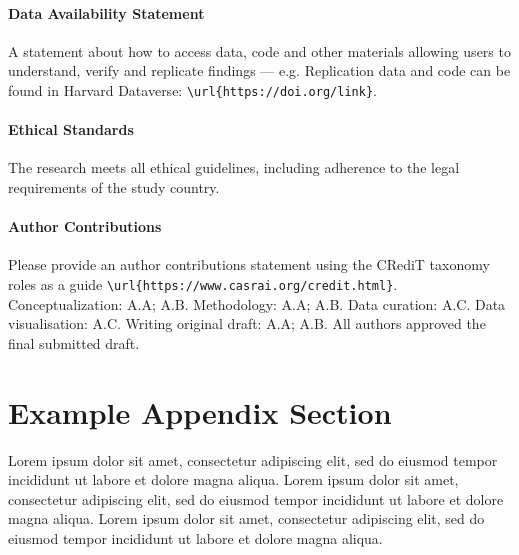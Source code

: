 \documentclass[
  journal=small,
  manuscript=article-type,  %
  year=2020,
  volume=37,
]{cup-journal}
\begin{document}
\paragraph{Data Availability Statement}
A statement about how to access data, code and other materials allowing users to understand, verify and replicate findings --- e.g. Replication data and code can be found in Harvard Dataverse: \verb+\url{https://doi.org/link}+.

\paragraph{Ethical Standards}
The research meets all ethical guidelines, including adherence to the legal requirements of the study country.

\paragraph{Author Contributions}
Please provide an author contributions statement using the CRediT taxonomy roles as a guide {\verb+\url{https://www.casrai.org/credit.html}+}. Conceptualization: A.A; A.B. Methodology: A.A; A.B. Data curation: A.C. Data visualisation: A.C. Writing original draft: A.A; A.B. All authors approved the final submitted draft.



\printendnotes


\printbibliography[prenote={preamble}]

\appendix

\section{Example Appendix Section}

Lorem ipsum dolor sit amet, consectetur adipiscing elit, sed do eiusmod tempor incididunt ut labore et dolore magna aliqua. Lorem ipsum dolor sit amet, consectetur adipiscing elit, sed do eiusmod tempor incididunt ut labore et dolore magna aliqua. Lorem ipsum dolor sit amet, consectetur adipiscing elit, sed do eiusmod tempor incididunt ut labore et dolore magna aliqua. 
\end{document}
